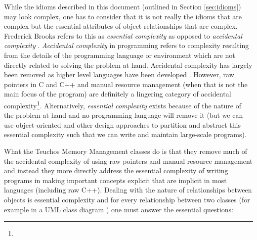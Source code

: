 \documentclass[pdf,ps2pdf,11pt]{SANDreport}
\begin{document}
While the idioms described in this document (outlined in Section
{}\ref{sec:idioms}) may look complex, one has to consider that it is
not really the idioms that are complex but the essential attributes of
object relationships that are complex.  Frederick Brooks refers to
this as {}\textit{essential complexity} as opposed to
{}\textit{accidental complexity} {}\cite{MythicalManMonth95}.
{}\textit{Accidental complexity} in programming refers to complexity
resulting from the details of the programming language or environment
which are not directly related to solving the problem at hand.
Accidental complexity has largely been removed as higher level
languages have been developed {}\cite[Chapter 16]{MythicalManMonth95}.
However, raw pointers in C and C++ and manual resource management
(when that is not the main focus of the program) are definitely a
lingering category of accidental complexity\footnote{
{}}.
Alternatively, {}\textit{essential complexity} exists because of the
nature of the problem at hand and no programming language will remove
it (but we can use object-oriented and other design approaches to
partition and abstract this essential complexity such that we can
write and maintain large-scale programs).

What the Teuchos Memory Management classes do is that they remove much
of the accidental complexity of using raw pointers and manual resource
management and instead they more directly address the essential
complexity of writing programs in making important concepts explicit
that are implicit in most languages (including raw C++).  Dealing with
the nature of relationships between objects is essential complexity
and for every relationship between two classes (for example in a UML
class diagram {}\cite{UMLDistilledThirdEdition04}) one must answer the
essential questions:
\end{document}
